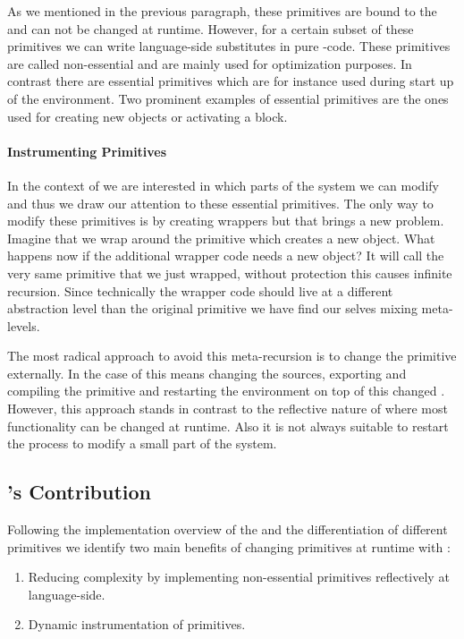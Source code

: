 As we mentioned in the previous paragraph, these primitives are bound to the \VM and can not be changed at runtime.
However, for a certain subset of these primitives we can write language-side substitutes in pure \PH-code.
These primitives are called non-essential and are mainly used for optimization purposes. 
In contrast there are essential primitives which are for instance used during start up of the \PH environment.
Two prominent examples of essential primitives are the ones used for creating new objects or activating a block.

\paragraph{Instrumenting Primitives}
In the context of \WF we are interested in which parts of the system we can modify and thus we draw our attention to these essential primitives.
The only way to modify these primitives is by creating wrappers but that brings a new problem.
Imagine that we wrap around the primitive which creates a new object.
What happens now if the additional wrapper code needs a new object?
It will call the very same primitive that we just wrapped, without protection this causes infinite recursion.
Since technically the wrapper code should live at a different abstraction level than the original primitive we have find our selves mixing meta-levels.

The most radical approach to avoid this meta-recursion is to change the primitive externally.
In the case of \PH this means changing the \Slang sources, exporting and compiling the primitive and restarting the \PH environment on top of this changed \VM.
However, this approach stands in contrast to the reflective nature of \PH where most functionality can be changed at runtime.
Also it is not always suitable to restart the \PH process to modify a small part of the system.

\subsection{\WF's Contribution}
Following the implementation overview of the \PH \VM and the differentiation of different primitives we identify two main benefits of changing \VM primitives at runtime with \WF:

\begin{enumerate}
	\item Reducing \VM complexity by implementing non-essential primitives reflectively at language-side.
	\item Dynamic instrumentation of primitives.
\end{enumerate}

